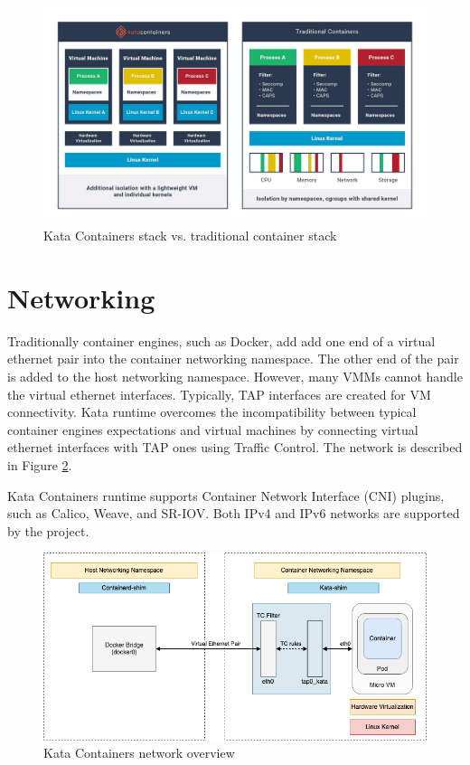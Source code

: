 \begin{figure}[ht]
  \begin{center}
    \includegraphics[width=13.5cm]{LaTeX/images/KataContainersStack.jpg}
    \caption{Kata Containers stack vs. traditional container stack \cite{KataContainers}}
    \label{fig:KataContainersStack}
  \end{center}
\end{figure} 

\section{Networking}

Traditionally container engines, such as Docker, add add one end of a virtual ethernet pair into the container networking namespace. The other end of the pair is added to the host networking namespace. However, many VMMs cannot handle the virtual ethernet interfaces. Typically, TAP interfaces are created for VM connectivity. Kata runtime overcomes the incompatibility between typical container engines expectations and virtual machines by connecting virtual ethernet interfaces with TAP ones using Traffic Control. The network is described in Figure \ref{fig:KataContainersNetwork}. \cite{KataContainersArchitecture}

Kata Containers runtime supports Container Network Interface (CNI) \cite{CNI} plugins, such as Calico, Weave, and SR-IOV. Both IPv4 and IPv6 networks are supported by the project.

\begin{figure}[ht]
  \begin{center}
    \includegraphics[width=13.5cm]{LaTeX/images/KataContainersNetwork.png}
    \caption{Kata Containers network overview \cite{KataContainersArchitecture}}
    \label{fig:KataContainersNetwork}
  \end{center}
\end{figure}

